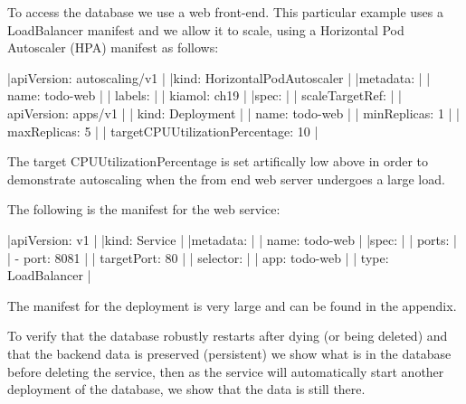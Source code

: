 To access the database we use a web front-end.  This particular example uses a LoadBalancer manifest and we allow it to scale, using a Horizontal Pod Autoscaler (HPA) manifest as follows:

\ms

\beginlines
|apiVersion: autoscaling/v1                 |
|kind: HorizontalPodAutoscaler              |
|metadata:                                  |
|  name: todo-web                           |
|  labels:                                  |
|    kiamol: ch19                           |
|spec:                                      |
|  scaleTargetRef:                          |
|    apiVersion: apps/v1                    |
|    kind: Deployment                       |
|    name: todo-web                         |
|  minReplicas: 1                           |
|  maxReplicas: 5                           |
|  targetCPUUtilizationPercentage: 10       |
\endlines

\ms

The target CPUUtilizationPercentage is set artifically low above in order to demonstrate autoscaling when the from end web server undergoes a large load.

The following is the manifest for the web service:

\ms

\beginlines
|apiVersion: v1         |
|kind: Service          |
|metadata:              |
|  name: todo-web       |
|spec:                  |
|  ports:               |
|    - port: 8081       |
|      targetPort: 80   |
|  selector:            |
|    app: todo-web      |
|  type: LoadBalancer   |
\endlines

The manifest for the deployment is very large and can be found in the appendix.



\myiteminit

\myitem To verify that the database robustly restarts after dying (or being deleted) and that
the backend data is preserved (persistent) we show what is in the database before
deleting the service, then as the service will automatically start another deployment
of the database, we show that the data is still there.






























